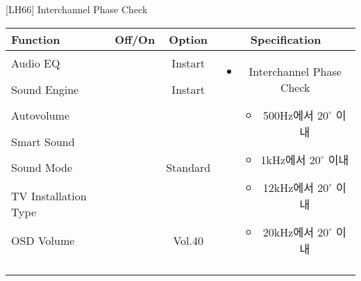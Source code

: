 \begin{frame}[t]{[LH66] Interchannel Phase Check}
\begin{tiny}
\begin{tabular}{@{}lccc@{}}
\toprule
Function & Off/On & Option & Specification \\
\midrule
Audio EQ & \color{black}{Off} & Instart &
\multirow{10}{60mm}{
\begin{itemize}
\item Interchannel Phase Check
	\begin{itemize}
	\item 500Hz에서 \(20^\circ\) 이내
	\item 1kHz에서 \(20^\circ\) 이내
	\item 12kHz에서 \(20^\circ\) 이내
	\item 20kHz에서 \(20^\circ\) 이내
	\end{itemize}
\end{itemize}
} \\
Sound Engine & \color{black}{Off} & Instart & \\
Autovolume & \color{black}{Off} & & \\
Smart Sound & \color{black}{Off} & & \\
Sound Mode & \color{blue}{On} & Standard & \\
TV Installation Type & \color{blue}{On} & \color{black}{Standtype1} & \\
OSD Volume & \color{blue}{On} & Vol.40 & \\
& & & \\
& & & \\
& & & \\
& & & \\
\midrule
\end{tabular}
\end{tiny}

\end{frame}
